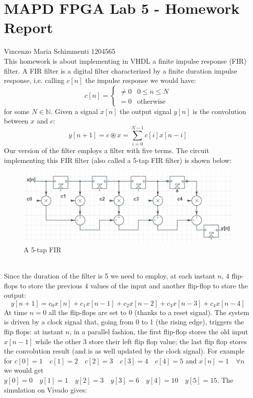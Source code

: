 \documentclass[a4paper,12pt]{article}
\begin{document}
\section*{MAPD FPGA Lab 5 - Homework Report}
Vincenzo Maria Schimmenti 1204565\\
This homework is about implementing in VHDL a finite impulse response (FIR) filter. A FIR filter is a digital filter characterized by a finite duration impulse response, i.e. calling $c[n]$ the impulse response we would have:
$$c[n]=\begin{cases}
\neq 0 & 0 \leq n \leq N \\
= 0 & \textrm{otherwise}
\end{cases}$$
for some $N \in \mathbb{N}$. Given a signal $x[n]$ the output signal $y[n]$ is the convolution between $x$ and $c$:
$$y[n+1]=c \circledast x = \sum_{i=0}^{N-1} c[i]x[n-i]$$
Our version of the filter employs a filter with five terms. The circuit implementing this FIR filter (also called a 5-tap FIR filter) is shown below:\\
\begin{figure}[h!]
	\includegraphics[width=\linewidth]{fir5.png}
	\caption{A 5-tap FIR}
	\label{fig:fir5}
\end{figure}\\
Since the duration of the filter is 5 we need to employ, at each instant $n$, 4 flip-flops to store the previous 4 values of the input and another flip-flop to store the output:
$$y[n+1]=c_0 x[n] + c_1x[n-1]+c_2x[n-2]+c_3x[n-3] + c_4x[n-4]$$
At time $n=0$ all the flip-flops are set to $0$ (thanks to a reset signal). The system is driven by a clock signal that, going from 0 to 1 (the rising edge), triggers the flip flops: at instant $n$, in a parallel fashion, the first flip-flop stores the old input $x[n-1]$ while the other 3 store their left flip flop value; the last flip flop stores the convolution result (and is as well updated by the clock signal).
\newpage For example for $c[0]=1 \quad c[1]=2 \quad c[2]=3 \quad c[3]=4 \quad c[4]=5$ and $x[n]=1 \quad \forall n$ we would get $y[0]=0\quad y[1]=1 \quad y[2] =3 \quad y[3] = 6 \quad y[4] = 10 \quad y[5]=15$. The simulation on Vivado gives:
\end{document}
